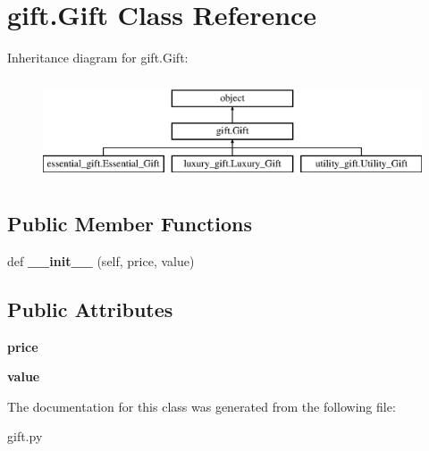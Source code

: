 \hypertarget{classgift_1_1_gift}{}\section{gift.\+Gift Class Reference}
\label{classgift_1_1_gift}
Inheritance diagram for gift.\+Gift\+:\begin{figure}[H]
\begin{center}
\leavevmode
\includegraphics[height=3.000000cm]{classgift_1_1_gift}
\end{center}
\end{figure}
\subsection*{Public Member Functions}
\begin{DoxyCompactItemize}
\item 
\mbox{\label{classgift_1_1_gift_a20b81810167aa6a14b2dadd7aab7cdca}} 
def {\bfseries \+\_\+\+\_\+init\+\_\+\+\_\+} (self, price, value)
\end{DoxyCompactItemize}
\subsection*{Public Attributes}
\begin{DoxyCompactItemize}
\item 
\mbox{\label{classgift_1_1_gift_ac265a271fb78f102f1198212a0f4a1b4}} 
{\bfseries price}
\item 
\mbox{\label{classgift_1_1_gift_a76bee92b20c109b3f53a752ba2036da3}} 
{\bfseries value}
\end{DoxyCompactItemize}


The documentation for this class was generated from the following file\+:\begin{DoxyCompactItemize}
\item 
gift.\+py\end{DoxyCompactItemize}
